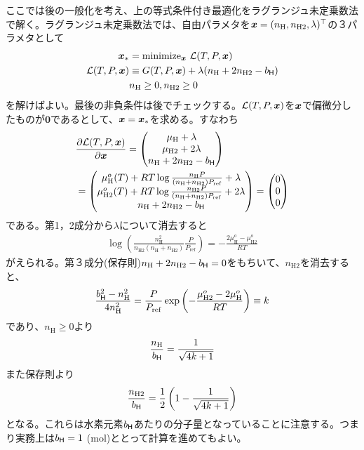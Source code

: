 ここでは後の一般化を考え、上の等式条件付き最適化をラグランジュ未定乗数法で解く。ラグランジュ未定乗数法では、自由パラメタを$\boldsymbol{x} = ( n_\mathrm{H},  n_\mathrm{H2}, \lambda )^\top$の３パラメタとして
\begin{align}
\label{eq:opt2tce}
    \boldsymbol{x}_\ast &= \mathrm{minimize}_{\boldsymbol{x}} \,\, \mathcal{L} (T, P, \boldsymbol{x}) \\ 
    \mathcal{L} (T, P, \boldsymbol{x}) &\equiv G(T, P, \boldsymbol{x}) + \lambda (n_\mathrm{H}  + 2 n_\mathrm{H2} - b_{\mathsf{H}} ) \\
    \label{eq:nonnegative_tce}
    &n_\mathrm{H} \ge 0, n_\mathrm{H2} \ge 0
\end{align}
を解けばよい。最後の非負条件は後でチェックする。$\mathcal{L} (T, P, \boldsymbol{x})$を$\boldsymbol{x}$で偏微分したものが$\boldsymbol{0}$であるとして、$\boldsymbol{x}=\boldsymbol{x}_\ast$を求める。すなわち
\begin{align}
&\frac{\partial \mathcal{L} (T, P, \boldsymbol{x})}{\partial \boldsymbol{x}} = 
\begin{pmatrix}
    \mu_\mathrm{H} + \lambda \\
    \mu_\mathrm{H2} + 2 \lambda \\
    n_\mathrm{H} + 2 n_\mathrm{H2} -  b_{\mathsf{H}} 
\end{pmatrix}\\
&=
\displaystyle{
\begin{pmatrix}
    \mu_\mathrm{H}^o(T) + RT \log{\frac{n_\mathrm{H} P}{(n_\mathrm{H} + n_\mathrm{H2}) P_\mathrm{ref}}}  + \lambda \\
    \mu_\mathrm{H2}^o(T) + RT\log{\frac{n_\mathrm{H2} P}{(n_\mathrm{H} + n_\mathrm{H2}) P_\mathrm{ref}}} + 2 \lambda \\
    n_\mathrm{H} + 2 n_\mathrm{H2} -  b_{\mathsf{H}} 
\end{pmatrix}
}
=
\begin{pmatrix}
    0 \\
    0 \\
    0
\end{pmatrix}
\end{align}
である。第1，2成分から$\lambda$について消去すると
\begin{align}
    \log{\left( \frac{n_\mathrm{H}^2 }{n_\mathrm{H2} (n_\mathrm{H} + n_\mathrm{H2})} \frac{P}{P_\mathrm{ref}} \right)} =- \frac{2 \mu_\mathrm{H}^o - \mu_\mathrm{H2}^o}{RT} 
\end{align}
がえられる。第３成分(保存則)$n_\mathrm{H} + 2 n_\mathrm{H2} - b_{\mathsf{H}}=0$をもちいて、$n_\mathrm{H2}$を消去すると、
\begin{align}
\frac{ b_{\mathsf{H}}^2 - n_\mathrm{H}^2}{4 n_\mathrm{H}^2} = \frac{P}{P_\mathrm{ref}} 
\exp{\left( - \frac{\mu_\mathrm{H2}^o - 2 \mu_\mathrm{H}^o}{RT} \right)}  \equiv k
\end{align}
であり、$n_\mathrm{H} \ge 0$より
\begin{align}
 \frac{n_\mathrm{H}}{ b_{\mathsf{H}} } = \frac{1}{\sqrt{4 k + 1}}
\end{align}
また保存則より
\begin{align}
 \frac{n_\mathrm{H2}}{ b_{\mathsf{H}} } = \frac{1}{2} \left( 1 - \frac{1}{\sqrt{4 k + 1}} \right)
\end{align}
となる。これらは水素元素$b_{\mathsf{H}}$あたりの分子量となっていることに注意する。つまり実務上は$b_{\mathsf{H}}=1$ (mol)ととって計算を進めてもよい。

